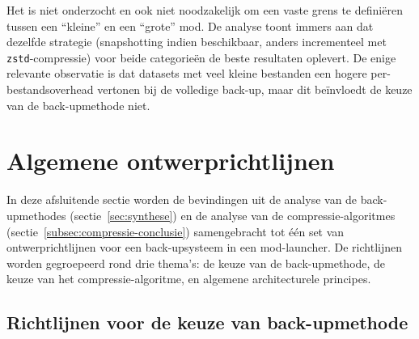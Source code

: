 Het is niet onderzocht en ook niet noodzakelijk om een vaste grens te definiëren tussen een ``kleine'' en een ``grote'' mod. De analyse toont immers aan dat dezelfde strategie (snapshotting indien beschikbaar, anders incrementeel met \texttt{zstd}-compressie) voor beide categorieën de beste resultaten oplevert. De enige relevante observatie is dat datasets met veel kleine bestanden een hogere per-bestandsoverhead vertonen bij de volledige back-up, maar dit beïnvloedt de keuze van de back-upmethode niet.

\section{Algemene ontwerprichtlijnen}
\label{sec:ontwerprichtlijnen}

In deze afsluitende sectie worden de bevindingen uit de analyse van de back-upmethodes (sectie~\ref{sec:synthese}) en de analyse van de compressie-algoritmes (sectie~\ref{subsec:compressie-conclusie}) samengebracht tot één set van ontwerprichtlijnen voor een back-up\-systeem in een mod-launcher. De richtlijnen worden gegroepeerd rond drie thema's: de keuze van de back-upmethode, de keuze van het compressie-algoritme, en algemene architecturele principes.

\subsection{Richtlijnen voor de keuze van back-upmethode}


